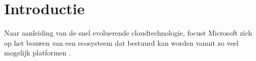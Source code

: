 
\section{Introductie}%
\label{sec:introductie}

\begin{comment}
Waarover zal je bachelorproef gaan? Introduceer het thema en zorg dat volgende zaken zeker duidelijk aanwezig zijn:

\begin{itemize}
  \item kaderen thema
  \item de doelgroep
  \item de probleemstelling en (centrale) onderzoeksvraag
  \item de onderzoeksdoelstelling
\end{itemize}

Denk er aan: een typische bachelorproef is \textit{toegepast onderzoek}, wat betekent dat je start vanuit een concrete probleemsituatie in bedrijfscontext, een \textbf{casus}. Het is belangrijk om je onderwerp goed af te bakenen: je gaat voor die \textit{ene specifieke probleemsituatie} op zoek naar een goede oplossing, op basis van de huidige kennis in het vakgebied.

De doelgroep moet ook concreet en duidelijk zijn, dus geen algemene of vaag gedefinieerde groepen zoals \emph{bedrijven}, \emph{developers}, \emph{Vlamingen}, enz. Je richt je in elk geval op it-professionals, een bachelorproef is geen populariserende tekst. Eén specifiek bedrijf (die te maken hebben met een concrete probleemsituatie) is dus beter dan \emph{bedrijven} in het algemeen.

Formuleer duidelijk de onderzoeksvraag! De begeleiders lezen nog steeds te veel voorstellen waarin we geen onderzoeksvraag terugvinden.

Schrijf ook iets over de doelstelling. Wat zie je als het concrete eindresultaat van je onderzoek, naast de uitgeschreven scriptie? Is het een proof-of-concept, een rapport met aanbevelingen, \ldots Met welk eindresultaat kan je je bachelorproef als een succes beschouwen?

\end{comment}

Naar aanleiding van de snel evoluerende cloudtechnologie, focust Microsoft zich op het bouwen van een ecosysteem dat bestuurd kan worden vanuit zo veel mogelijk platformen \autocite{Parker2021}.

